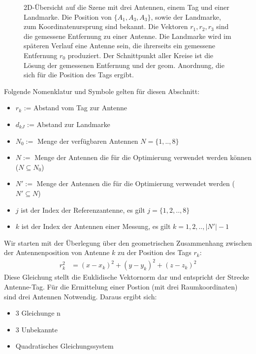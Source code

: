 \begin{figure}
	\begin{center}
		\caption[Antennen-Szene mit einem Tag]{2D-Übersicht auf die Szene mit drei Antennen, einem Tag und einer Landmarke. Die Position von $\{A_1,A_3,A_3\}$, sowie der Landmarke, zum Koordinatenursprung sind bekannt. Die Vektoren $r_1,r_2,r_3$ sind die gemessene Entfernung zu einer Antenne. Die Landmarke wird im späteren Verlauf eine Antenne sein, die ihrerseits ein gemessene Entfernung $r_0$ produziert. Der Schnittpunkt aller Kreise ist die Lösung der gemessenen Entfernung und der geom. Anordnung, die sich für die Position des Tags ergibt.} 
		\label{fig:TrilaterationScene}
		
%		
	\end{center}
\end{figure}
%
Folgende Nomenklatur und Symbole gelten für diesen Abschnitt:
\begin{itemize}[itemsep=0mm]
	\item	$r_{k}$ := Abstand vom Tag zur Antenne
	\item	$d_{kJ}$ := Abstand zur Landmarke
	\item	$N_0:=$ Menge der verfügbaren Antennen $N=\{1,..,8\}$
	\item	$N:=$ Menge der Antennen die für die Optimierung verwendet werden können ($N \subseteq N_0$)
	\item	$N':=$ Menge der Antennen die für die Optimierung verwendet werden ($N' \subseteq N$)
	\item	$j$ ist der Index der Referenzantenne, es gilt $j = \{1,2,..,8\}$
	\item	$k$ ist der Index der Antennen einer Messung, es gilt $k = 1,2,..,|N'|-1$
\end{itemize}
%
Wir starten mit der Überlegung über den geometrischen Zusammenhang zwischen der Antennenposition von Antenne $k$ zu der Position des Tags $r_k$:
\begin{align}
	\label{eq:base_vactor}
	r_{k}^2 &= (x-x_k)^2+(y-y_k)^2+(z-z_k)^2
\end{align}
%
Diese Gleichung stellt die Euklidische Vektornorm dar und entspricht der Strecke Antenne-Tag. Für die Ermittelung einer Postion (mit drei Raumkoordinaten) sind drei Antennen Notwendig. Daraus ergibt sich:
%
\begin{itemize}
\item 3 Gleichunge n
\item 3 Unbekannte
\item Quadratisches Gleichungssystem
\end{itemize}
